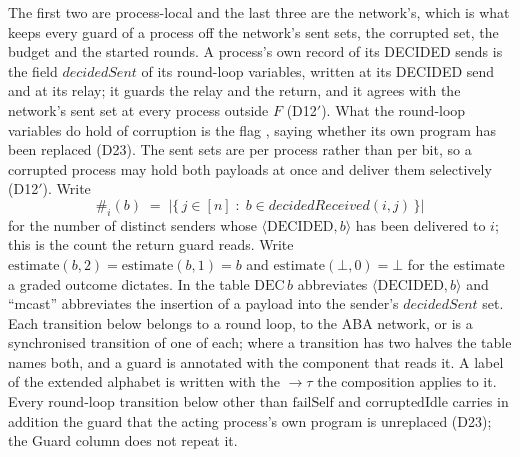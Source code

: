 The first two are process-local and the last three are the network's, which is what keeps every guard of a process off the network's sent sets, the corrupted set, the budget and the started rounds.
A process's own record of its DECIDED sends is the field $decidedSent$ of its round-loop variables, written at its DECIDED send and at its relay; it guards the relay and the return, and it agrees with the network's sent set at every process outside $F$ (D12$'$).
What the round-loop variables do hold of corruption is the flag
, saying whether its own program has been
replaced (D23).
The sent sets are per process rather than per bit, so a corrupted process may hold both payloads at once and deliver them selectively (D12$'$).
Write
\[
  \#_i(b) \;=\; |\{\, j \in [n] \;:\; b \in \mathit{decidedReceived}(i,j) \,\}|
\]
for the number of distinct senders whose $\langle\mathrm{DECIDED}, b\rangle$ has been delivered to $i$; this is the count the return guard reads.
Write $\mathrm{estimate}(b,2) = \mathrm{estimate}(b,1) = b$ and $\mathrm{estimate}(\bot,0) = \bot$ for the estimate a graded outcome dictates.
In the table $\mathrm{DEC}\,b$ abbreviates $\langle\mathrm{DECIDED}, b\rangle$ and ``mcast'' abbreviates the insertion of a payload into the sender's $\mathit{decidedSent}$ set.
Each transition below belongs to a round loop, to the ABA network, or is a synchronised transition of one of each; where a transition has two halves the table names both, and a guard is annotated with the component that reads it.
A label of the extended alphabet is written with the $\to\tau$ the composition applies to it.
Every round-loop transition below other than $\mathrm{failSelf}$ and $\mathrm{corruptedIdle}$ carries in addition the guard that the acting process's own program is unreplaced (D23); the Guard column does not repeat it.

